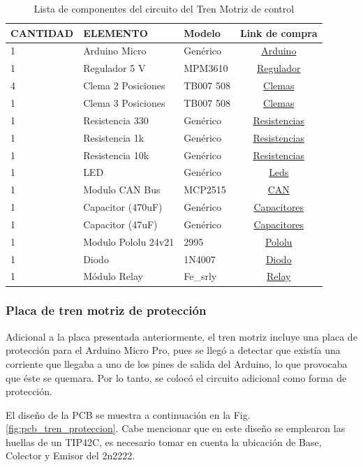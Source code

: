 \documentclass[11pt, a4paper]{article}
\begin{document}
\begin{table}[H]
\centering
\caption{Lista de componentes del circuito del Tren Motriz de control}
\label{tab:comp_tren_control}
\begin{tabular}{lllc}
\toprule
\textbf{CANTIDAD} & \textbf{ELEMENTO} & \textbf{Modelo} & \textbf{Link de compra} \\
\midrule
1 & Arduino Micro & Genérico & \href{#}{Arduino} \\
1 & Regulador 5 V & MPM3610 & \href{#}{Regulador} \\
4 & Clema 2 Posiciones & TB007 508 & \href{#}{Clemas} \\
1 & Clema 3 Posiciones & TB007 508 & \href{#}{Clemas} \\
1 & Resistencia 330 & Genérico & \href{#}{Resistencias} \\
1 & Resistencia 1k & Genérico & \href{#}{Resistencias} \\
1 & Resistencia 10k & Genérico & \href{#}{Resistencias} \\
1 & LED & Genérico & \href{#}{Leds} \\
1 & Modulo CAN Bus & MCP2515 & \href{#}{CAN} \\
1 & Capacitor (470uF) & Genérico & \href{#}{Capacitores} \\
1 & Capacitor (47uF) & Genérico & \href{#}{Capacitores} \\
1 & Modulo Pololu 24v21 & 2995 & \href{#}{Pololu} \\
1 & Diodo & 1N4007 & \href{#}{Diodo} \\
1 & Módulo Relay & Fe\_srly & \href{#}{Relay} \\
\bottomrule
\end{tabular}
\end{table}

\subsubsection{Placa de tren motriz de protección}
Adicional a la placa presentada anteriormente, el tren motriz incluye una placa de protección para el Arduino Micro Pro, pues se llegó a detectar que existía una corriente que llegaba a uno de los pines de salida del Arduino, lo que provocaba que éste se quemara. Por lo tanto, se colocó el circuito adicional como forma de protección.

El diseño de la PCB se muestra a continuación en la Fig. \ref{fig:pcb_tren_proteccion}. Cabe mencionar que en este diseño se emplearon las huellas de un TIP42C, es necesario tomar en cuenta la ubicación de Base, Colector y Emisor del 2n2222.
\end{document}
